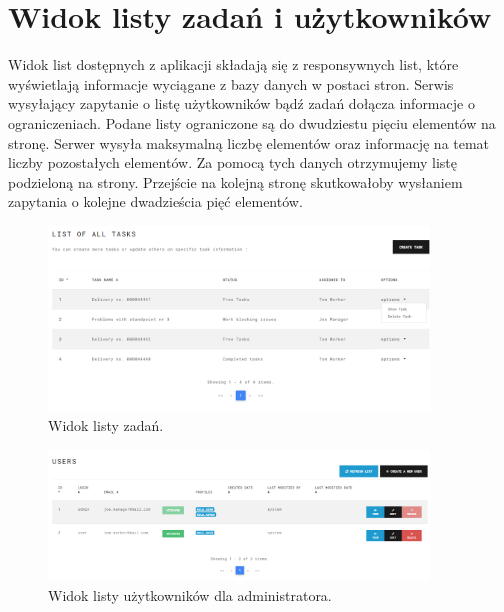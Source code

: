 \section{Widok listy zadań i użytkowników}
Widok list dostępnych z aplikacji składają się z responsywnych list, które wyświetlają informacje wyciągane z bazy danych w postaci stron. Serwis wysyłający zapytanie o listę użytkowników bądź zadań dołącza informacje o ograniczeniach. Podane listy ograniczone są do dwudziestu pięciu elementów na stronę. Serwer wysyła maksymalną liczbę elementów oraz informację na temat liczby pozostałych elementów. Za pomocą tych danych otrzymujemy listę podzieloną na strony. Przejście na kolejną stronę skutkowałoby wysłaniem zapytania o kolejne dwadzieścia pięć elementów.
\begin{figure}[h!]
	\centering
	\includegraphics[width=0.90\textwidth]{taskslist}
	
	\caption{Widok listy zadań.}
	\label{tasklist}
\end{figure}

\begin{figure}[h!]
	\centering
	\includegraphics[width=0.90\textwidth]{users-lists}
	
	\caption{Widok listy użytkowników dla administratora.}
	\label{users-list}
\end{figure}
\clearpage


